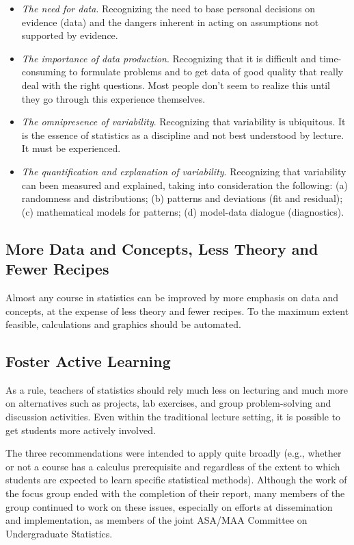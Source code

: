 \begin{itemize}[leftmargin=1cm, itemsep=.2em]
\item \textit{The need for data}.  Recognizing the need to base personal decisions on evidence (data) and the dangers inherent in acting on assumptions not supported by evidence.
\item \textit{The importance of data production}.  Recognizing that it is difficult and time-consuming to formulate problems and to get data of good quality that really deal with the right questions. Most people don't seem to realize this until they go through this experience themselves.
\item \textit{The omnipresence of variability}.  Recognizing that variability is ubiquitous. It is the essence of statistics as a discipline and not best understood by lecture. It must be experienced.
\item \textit{The quantification and explanation of variability}. Recognizing that variability can been measured and explained, taking into consideration the following: (a) randomness and distributions; (b) patterns and deviations (fit and residual); (c) mathematical models for patterns; (d) model-data dialogue (diagnostics).
\end{itemize}


\subsection{\textbf{More Data and Concepts, Less Theory and Fewer Recipes}}
Almost any course in statistics can be improved by more emphasis on data and concepts, at the expense of less theory and fewer recipes. To the maximum extent feasible, calculations and graphics should be automated.


\subsection{\textbf{Foster Active Learning}}
As a rule, teachers of statistics should rely much less on lecturing and much more on alternatives such as projects, lab exercises, and group problem-solving and discussion activities. Even within the traditional lecture setting, it is possible to get students more actively involved.  

The three recommendations were intended to apply quite broadly (e.g., whether or not a course has a calculus prerequisite and regardless of the extent to which students are expected to learn specific statistical methods).  Although the work of the focus group ended with the completion of their report, many members of the group continued to work on these issues, especially on efforts at dissemination and implementation, as members of the joint ASA/MAA Committee on Undergraduate Statistics.

